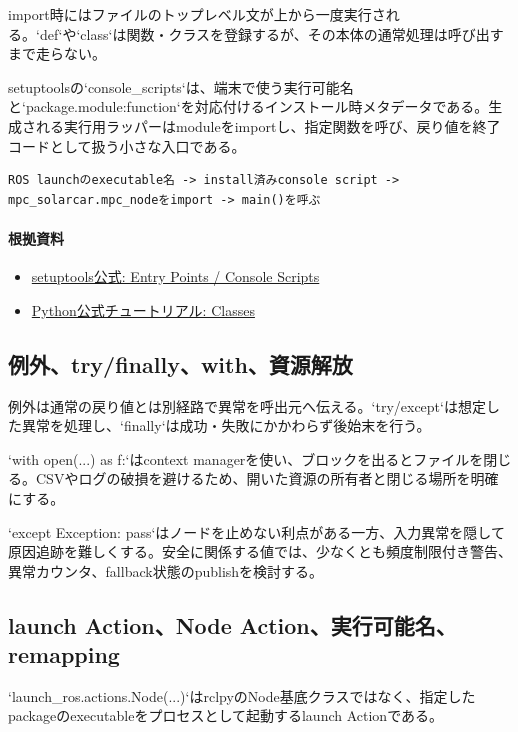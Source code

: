 \documentclass[a4paper,11pt]{article}
\begin{document}
import時にはファイルのトップレベル文が上から一度実行される。`def`や`class`は関数・クラスを登録するが、その本体の通常処理は呼び出すまで走らない。


setuptoolsの`console\_scripts`は、端末で使う実行可能名と`package.module:function`を対応付けるインストール時メタデータである。生成される実行用ラッパーはmoduleをimportし、指定関数を呼び、戻り値を終了コードとして扱う小さな入口である。


\begin{lstlisting}
ROS launchのexecutable名 -> install済みconsole script -> mpc_solarcar.mpc_nodeをimport -> main()を呼ぶ
\end{lstlisting}

\paragraph{根拠資料}
\begin{itemize}[leftmargin=1.6em]
\item \href{https://setuptools.pypa.io/en/latest/userguide/entry_point.html}{setuptools公式: Entry Points / Console Scripts}
\item \href{https://docs.python.org/3/tutorial/classes.html}{Python公式チュートリアル: Classes}
\end{itemize}

\subsection{例外、try/finally、with、資源解放}
例外は通常の戻り値とは別経路で異常を呼出元へ伝える。`try/except`は想定した異常を処理し、`finally`は成功・失敗にかかわらず後始末を行う。


`with open(...) as f:`はcontext managerを使い、ブロックを出るとファイルを閉じる。CSVやログの破損を避けるため、開いた資源の所有者と閉じる場所を明確にする。


`except Exception: pass`はノードを止めない利点がある一方、入力異常を隠して原因追跡を難しくする。安全に関係する値では、少なくとも頻度制限付き警告、異常カウンタ、fallback状態のpublishを検討する。



\subsection{launch Action、Node Action、実行可能名、remapping}
`launch\_ros.actions.Node(...)`はrclpyのNode基底クラスではなく、指定したpackageのexecutableをプロセスとして起動するlaunch Actionである。
\end{document}
